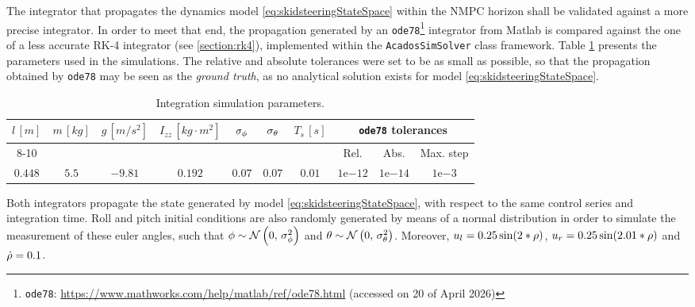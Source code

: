 The integrator that propagates the dynamics model \eqref{eq:skidsteeringStateSpace} within the NMPC horizon shall be validated against a more precise integrator. In order to meet that end, the propagation generated by an \texttt{ode78}\footnote{\texttt{ode78}: \url{https://www.mathworks.com/help/matlab/ref/ode78.html} (accessed on 20 of April 2026)} integrator from Matlab is compared against the one of a less accurate RK-4 integrator (see \ref{section:rk4}), implemented within the \texttt{AcadosSimSolver} class framework. Table \ref{tab:intspecs} presents the parameters used in the simulations. The relative and absolute tolerances were set to be as small as possible, so that the propagation obtained by \texttt{ode78} may be seen as the \textit{ground truth}, as no analytical solution exists for model \eqref{eq:skidsteeringStateSpace}.

\begin{table}[!htb]
  \caption[Integration simulation parameters.]{Integration simulation parameters.}
  \label{tab:intspecs}
  \renewcommand{\arraystretch}{1.2} %
  \centering
  \begin{tabular}{cccccccccc}
    \toprule
    $l\,[m]$ & $m\,[kg]$ & $g\,[m/s^2]$ & $I_{zz}\,[kg \cdot m^2]$ & $\sigma_{\phi}$ & $\sigma_{\theta}$ & $T_s\,[s]$ & \multicolumn{3}{c}{\texttt{ode78} tolerances}   \\
    \cmidrule(lr){8-10}
     &  &  &  &  &  &  & Rel. & Abs. & Max. step \\
    \midrule
    $0.448$ & $5.5$ & $-9.81$ & $0.192$ & $0.07$ & $0.07$ & $0.01$ & $1\mathrm{e}{-12}$ & $1\mathrm{e}{-14}$ & $1\mathrm{e}{-3}$\\
    \bottomrule
  \end{tabular}
\end{table}

Both integrators propagate the state generated by model \eqref{eq:skidsteeringStateSpace}, with respect to the same control series and integration time. Roll and pitch initial conditions are also randomly generated by means of a normal distribution in order to simulate the measurement of these euler angles, such that $\phi \sim \mathcal{N}\left(0,\,\sigma_{\phi}^2\right)$ and $\theta \sim \mathcal{N}\left(0,\,\sigma_{\theta}^2\right)$. Moreover, $u_l = 0.25 \sin(2 * \rho)$, $u_r = 0.25 \sin(2.01 * \rho)$ and $\dot{\rho} = 0.1$. 

